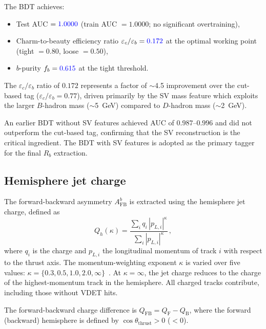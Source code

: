 \documentclass[11pt,a4paper]{article}
\newcommand{\measured}[1]{\textcolor{blue}{#1}}
\begin{document}
The BDT achieves:
\begin{itemize}
\item Test AUC $= \measured{1.0000}$ (train AUC $= 1.0000$; no
  significant overtraining),
\item Charm-to-beauty efficiency ratio
  $\varepsilon_c/\varepsilon_b = \measured{0.172}$ at the
  optimal working point (tight $= 0.80$, loose $= 0.50$),
\item $b$-purity $f_b = \measured{0.615}$ at the tight threshold.
\end{itemize}
The $\varepsilon_c/\varepsilon_b$ ratio of $0.172$ represents a
factor of $\sim$4.5 improvement over the cut-based tag
($\varepsilon_c/\varepsilon_b = 0.77$), driven primarily by the
SV mass feature which exploits the larger $B$-hadron mass
($\sim$5~GeV) compared to $D$-hadron mass ($\sim$2~GeV).

An earlier BDT without SV features achieved AUC of
$0.987$--$0.996$ and did not outperform the cut-based tag,
confirming that the SV reconstruction is the critical ingredient.
The BDT with SV features is adopted as the primary tagger for the
final $R_b$ extraction.

\subsection{Hemisphere jet charge}
\label{sec:tagging:jetcharge}

The forward-backward asymmetry $A_\text{FB}^b$ is extracted using
the hemisphere jet charge, defined as
\begin{equation}
Q_h(\kappa) = \frac{\sum_i q_i\, |p_{L,i}|^\kappa}
                    {\sum_i |p_{L,i}|^\kappa}\,,
\label{eq:jet_charge}
\end{equation}
where $q_i$ is the charge and $p_{L,i}$ the longitudinal momentum
of track $i$ with respect to the thrust axis.
The momentum-weighting exponent $\kappa$ is varied over five values:
$\kappa = \{0.3, 0.5, 1.0, 2.0, \infty\}$~\cite{ALEPH:AFBb}.
At $\kappa = \infty$, the jet charge reduces to the charge of the
highest-momentum track in the hemisphere.
All charged tracks contribute, including those without VDET hits.

The forward-backward charge difference is
$Q_\text{FB} = Q_\text{F} - Q_\text{B}$,
where the forward (backward) hemisphere is defined by
$\cos\theta_\text{thrust} > 0$ ($< 0$).
\end{document}
